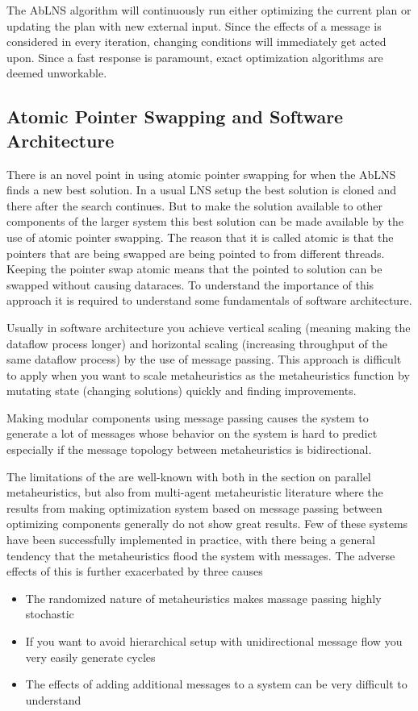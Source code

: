 The AbLNS algorithm will continuously run either optimizing the current plan or updating the plan 
with new external input. Since the effects of a message is considered in every iteration, changing 
conditions will immediately get acted upon. Since a fast response is paramount, exact optimization algorithms are deemed unworkable.

\subsection{Atomic Pointer Swapping and Software Architecture}
There is an novel point in using atomic pointer swapping for when the 
AbLNS finds a new best solution. In a usual LNS setup the best solution is 
cloned and there after the search continues. But to make the solution available
to other components of the larger system this best solution can be made available
by the use of atomic pointer swapping. The reason that it is called atomic is
that the pointers that are being swapped are being pointed to from different 
threads. Keeping the pointer swap atomic means that the pointed to solution
can be swapped without causing dataraces. To understand the importance of this
approach it is required to understand some fundamentals of software architecture.

Usually in software architecture you achieve vertical scaling (meaning making the 
dataflow process longer) and horizontal scaling (increasing throughput of the
same dataflow process) by the use of message passing. This approach is difficult
to apply when you want to scale metaheuristics as the metaheuristics function
by mutating state (changing solutions) quickly and finding improvements. 

Making modular components using message passing causes the system to generate 
a lot of messages whose behavior on the system is hard to predict especially
if the message topology between metaheuristics is bidirectional.

The limitations of the are well-known with both \citep{talbiMetaheuristicsDesignImplementation2009} 
in the section on parallel metaheuristics, but also from multi-agent metaheuristic
literature where the results from making optimization system based on message 
passing between optimizing components generally do not show great results.
Few of these systems have been successfully implemented in practice, with
there being a general tendency that the metaheuristics flood the system with
messages. The adverse effects of this is further exacerbated by three causes
\begin{itemize}
	\item The randomized nature of metaheuristics makes massage passing highly
		stochastic 
	\item If you want to avoid hierarchical setup with unidirectional message flow
		you very easily generate cycles
	\item The effects of adding additional messages to a system can be very 
		difficult to understand
\end{itemize}

